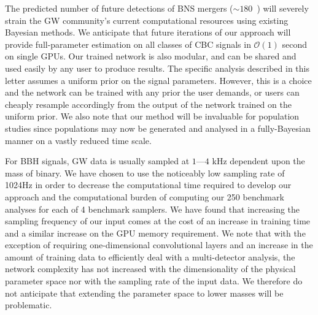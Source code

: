 \documentclass[%
showpacs,
nofootinbib,
 amsmath,amssymb,
 aps,
 twocolumn,
 prl,
 reprint,
floatfix,
]{revtex4-1}
\begin{document}
%
%
The predicted number of future detections of \ac{BNS} mergers ($\sim
180$~\cite{2018LRR....21....3A}) will severely strain the \ac{GW} community's
current computational resources using existing Bayesian methods. We anticipate
that future iterations of our approach will provide full-parameter estimation
on all classes of \ac{CBC} signals in $\mathcal{O}(1)$ second on single
\acp{GPU}. Our trained network is also modular, and can be shared and used
easily by any user to produce results. The specific analysis described in this
letter assumes a uniform prior on the signal parameters. However, this is a
choice and the network can be trained with any prior the user demands, or users
can cheaply resample accordingly from the output of the network trained on the
uniform prior. We also note that our method will be invaluable for population
studies since populations may now be generated and analysed in a fully-Bayesian
manner on a vastly reduced time scale. 

%
%
For \ac{BBH} signals, \ac{GW} data is usually sampled at $1$---$4$ kHz
dependent upon the mass of binary. We have chosen to use the noticeably low
sampling rate of 1024Hz in order to decrease the computational time
required to develop our approach and the computational burden of computing our
250 benchmark analyses for each of 4 benchmark samplers.  We have found that 
increasing the sampling frequency of our input comes at the cost of an increase 
in training time and a similar increase on the \ac{GPU} memory
requirement. We note that with the exception of requiring one-dimensional
convolutional layers and an increase in the amount of training data to
efficiently deal with a multi-detector analysis, the network complexity has not
increased 
with the dimensionality of the physical parameter space nor with the
sampling rate of the input data. We therefore do not anticipate that extending
the parameter space to lower masses will be problematic. 
\end{document}
